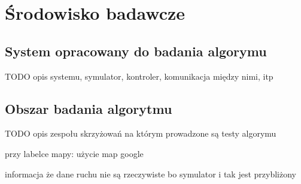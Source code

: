 \chapter{Środowisko badawcze}
\section{System opracowany do badania algorymu}
TODO opis systemu, symulator, kontroler, komunikacja między nimi, itp
\section{Obszar badania algorytmu}
TODO opis zespołu skrzyżowań na którym prowadzone są testy algorymu

przy labelce mapy: użycie map google \cite{google_maps}

informacja że dane ruchu nie są rzeczywiste bo symulator i tak jest przybliżony